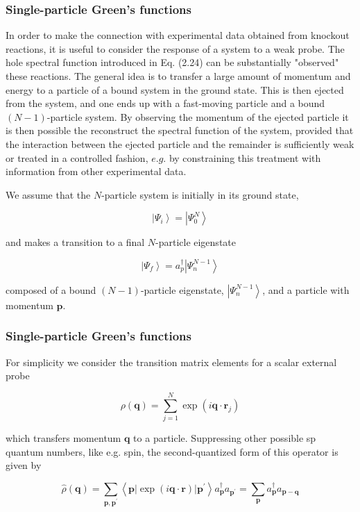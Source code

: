 \documentclass[compress]{beamer}
\begin{document}
\frame
{
\frametitle{Single-particle Green's functions}
\begin{small}
{\scriptsize
In order to make the connection with experimental data obtained from
knockout reactions, it is useful to consider the response of a system
to a weak probe. The hole spectral function introduced in Eq. (2.24)
can be substantially "observed" these reactions. The general idea is
to transfer a large amount of momentum and energy to a particle of a
bound system in the ground state. This is then ejected from the
system, and one ends up with a fast-moving particle and a bound
$(N-1)$-particle system. By observing the momentum of the ejected
particle it is then possible the reconstruct the spectral function of
the system, provided that the interaction between the ejected particle
and the remainder is sufficiently weak or treated in a controlled
fashion, $e . g$. by constraining this treatment with information from
other experimental data.

We assume that the $N$-particle system is initially in its ground state,

$$
\left|\Psi_{i}\right\rangle=\left|\Psi_{0}^{N}\right\rangle
$$

and makes a transition to a final $N$-particle eigenstate

$$
\left|\Psi_{f}\right\rangle=a_{p}^{\dagger}\left|\Psi_{n}^{N-1}\right\rangle
$$

composed of a bound $(N-1)$-particle eigenstate, $\left|\Psi_{n}^{N-1}\right\rangle$, and a particle with momentum $\boldsymbol{p}$.

}
\end{small}
}
\frame
{
\frametitle{Single-particle Green's functions}
\begin{small}
{\scriptsize
For simplicity we consider the transition matrix elements for a scalar external probe

$$
\rho(\boldsymbol{q})=\sum_{j=1}^{N} \exp \left(i \boldsymbol{q} \cdot \boldsymbol{r}_{j}\right)
$$

which transfers momentum $\boldsymbol{q}$ to a particle. Suppressing other possible sp quantum numbers, like e.g. spin, the second-quantized form of this operator is given by

$$
\hat{\rho}(\boldsymbol{q})=\sum_{\boldsymbol{p}, \boldsymbol{p}^{\prime}}\left\langle\boldsymbol{p}|\exp (i \boldsymbol{q} \cdot \boldsymbol{r})| \boldsymbol{p}^{\prime}\right\rangle a_{\boldsymbol{p}}^{\dagger} a_{\boldsymbol{p}^{\prime}}=\sum_{\boldsymbol{p}} a_{\boldsymbol{p}}^{\dagger} a_{\boldsymbol{p}-\boldsymbol{q}}
$$

}
\end{small}
}
\end{document}
